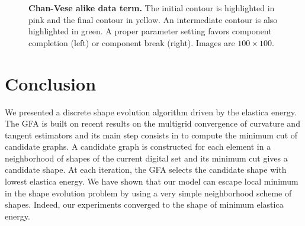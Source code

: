 \documentclass[review]{siamart220329}
\begin{document}
\begin{figure}
\center
{}\hspace{1em}%
%
\caption{\textbf{Chan-Vese alike data term.} The initial contour is highlighted in pink and the final contour in yellow. An intermediate contour is also highlighted in green. A proper parameter setting favors component completion (left) or component break (right). Images are $100\times100$. }
\label{fig:GF-chan-vese-alike}
\end{figure}
%
%
%
%
\section{Conclusion}
%
%
We presented a discrete shape evolution algorithm driven by the elastica energy. The GFA is built on recent results on the multigrid convergence of curvature and tangent estimators and its main step consists in to compute the minimum cut of candidate graphs. A candidate graph is constructed for each element in a neighborhood of shapes of the current digital set and its minimum cut gives a candidate shape. At each iteration, the GFA selects the candidate shape with lowest elastica energy. We have shown that our model can escape local minimum in the shape evolution problem by using a very simple neighborhood scheme of shapes. Indeed, our experiments converged to the shape of minimum elastica energy. 
\end{document}
